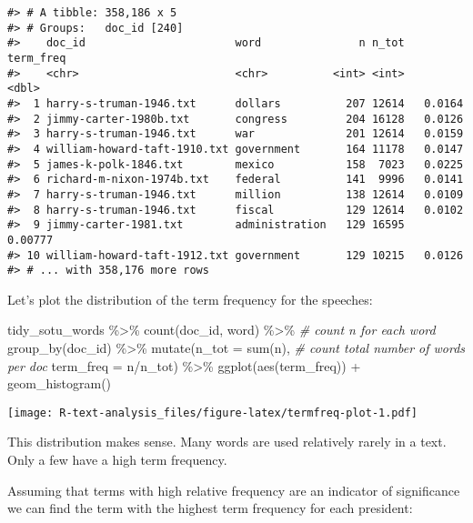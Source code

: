 \documentclass[
]{book}
\newenvironment{Shaded}{\begin{snugshade}}{\end{snugshade}}
\newcommand{\AttributeTok}[1]{\textcolor[rgb]{0.77,0.63,0.00}{#1}}
\newcommand{\CommentTok}[1]{\textcolor[rgb]{0.56,0.35,0.01}{\textit{#1}}}
\newcommand{\FunctionTok}[1]{\textcolor[rgb]{0.00,0.00,0.00}{#1}}
\newcommand{\NormalTok}[1]{#1}
\newcommand{\SpecialCharTok}[1]{\textcolor[rgb]{0.00,0.00,0.00}{#1}}
\begin{document}
\begin{verbatim}
#> # A tibble: 358,186 x 5
#> # Groups:   doc_id [240]
#>    doc_id                       word               n n_tot term_freq
#>    <chr>                        <chr>          <int> <int>     <dbl>
#>  1 harry-s-truman-1946.txt      dollars          207 12614   0.0164 
#>  2 jimmy-carter-1980b.txt       congress         204 16128   0.0126 
#>  3 harry-s-truman-1946.txt      war              201 12614   0.0159 
#>  4 william-howard-taft-1910.txt government       164 11178   0.0147 
#>  5 james-k-polk-1846.txt        mexico           158  7023   0.0225 
#>  6 richard-m-nixon-1974b.txt    federal          141  9996   0.0141 
#>  7 harry-s-truman-1946.txt      million          138 12614   0.0109 
#>  8 harry-s-truman-1946.txt      fiscal           129 12614   0.0102 
#>  9 jimmy-carter-1981.txt        administration   129 16595   0.00777
#> 10 william-howard-taft-1912.txt government       129 10215   0.0126 
#> # ... with 358,176 more rows
\end{verbatim}

Let's plot the distribution of the term frequency for the speeches:

\begin{Shaded}
\begin{Highlighting}[]
\NormalTok{tidy\_sotu\_words }\SpecialCharTok{\%\textgreater{}\%}
  \FunctionTok{count}\NormalTok{(doc\_id, word)  }\SpecialCharTok{\%\textgreater{}\%}  \CommentTok{\# count n for each word}
  \FunctionTok{group\_by}\NormalTok{(doc\_id) }\SpecialCharTok{\%\textgreater{}\%} 
  \FunctionTok{mutate}\NormalTok{(}\AttributeTok{n\_tot =} \FunctionTok{sum}\NormalTok{(n), }\CommentTok{\# count total number of words per doc}
         \AttributeTok{term\_freq =}\NormalTok{ n}\SpecialCharTok{/}\NormalTok{n\_tot) }\SpecialCharTok{\%\textgreater{}\%} 
  \FunctionTok{ggplot}\NormalTok{(}\FunctionTok{aes}\NormalTok{(term\_freq)) }\SpecialCharTok{+}
    \FunctionTok{geom\_histogram}\NormalTok{() }
\end{Highlighting}
\end{Shaded}

\texttt{[image: R-text-analysis\_files/figure-latex/termfreq-plot-1.pdf]}

This distribution makes sense. Many words are used relatively rarely in a text. Only a few have a high term frequency.

Assuming that terms with high relative frequency are an indicator of significance we can find the term with the highest term frequency for each president:
\end{document}
